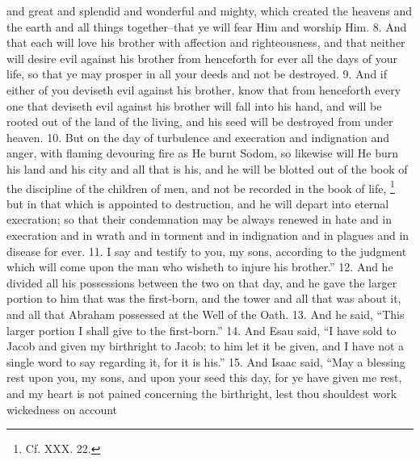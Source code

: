 and great and splendid and wonderful and mighty, which created the heavens and the earth and all things together--that ye will fear Him and worship Him. 8. And that each will love his brother with affection and righteousness, and that neither will desire evil against his brother from henceforth for ever all the days of your life, so that ye may prosper in all your deeds and not be destroyed. 9. And if either of you deviseth evil against his brother, know that from henceforth every one that deviseth evil against his brother will fall into his hand, and will be rooted out of the land of the living, and his seed will be destroyed from under heaven. 10. But on the day of turbulence and execration and indignation and anger, with flaming devouring fire as He burnt Sodom, so likewise will He burn his land and his city and all that is his, and he will be blotted out of the book of the discipline of the children of men, and not be recorded in the book of life, \footnote{Cf. XXX. 22.} but in that which is appointed to destruction, and he will depart into eternal execration; so that their condemnation may be always renewed in hate and in execration and in wrath and in torment and in indignation and in plagues and in disease for ever. 11. I say and testify to you, my sons, according to the judgment which will come upon the man who wisheth to injure his brother.'' 12. And he divided all his possessions between the two on that day, and he gave the larger portion to him that was the first-born, and the tower and all that was about it, and all that Abraham possessed at the Well of the Oath. 13. And he said, ``This larger portion I shall give to the first-born.'' 14. And Esau said, ``I have sold to Jacob and given my birthright to Jacob; to him let it be given, and I have not a single word to say regarding it, for it is his.'' 15. And Isaac said, ``May a blessing rest upon you, my sons, and upon your seed this day, for ye have given me rest, and my heart is not pained concerning the birthright, lest thou shouldest work wickedness on account

